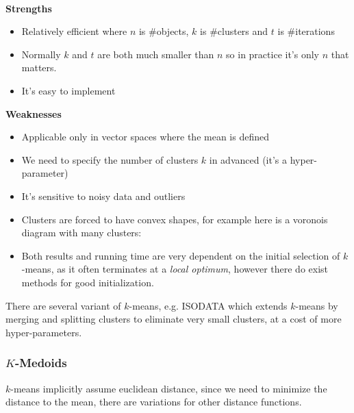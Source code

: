     \\
    
    \textbf{Strengths}
    \begin{itemize}
        \item Relatively efficient  where $n$ is \#objects, $k$ is 
        \#clusters and $t$ is \#iterations
        \item Normally $k$ and $t$ are both much smaller than $n$ so in 
        practice it's only $n$ that matters.
        \item It's easy to implement
    \end{itemize}
    \textbf{Weaknesses}
    \begin{itemize}
        \item Applicable only in vector spaces where the mean is defined
        \item We need to specify the number of clusters $k$ in advanced (it's a 
        hyper-parameter)
        \item It's sensitive to noisy data and outliers
        \item Clusters are forced to have convex shapes, for example here is a 
        voronois diagram with many clusters:\\
        \item Both results and running time are very dependent on the initial 
        selection of $k$-means, as it often terminates at a \textit{local 
        optimum}, however there do exist methods for good initialization.
    \end{itemize}
    There are several variant of $k$-means, e.g. ISODATA which extends 
    $k$-means by merging and splitting clusters to eliminate very small 
    clusters, at a cost of more hyper-parameters.
    
    \subsubsection{$K$-Medoids}
    $k$-means implicitly assume euclidean distance, since we need to minimize 
    the distance to the mean, there are variations for other distance functions.
    
